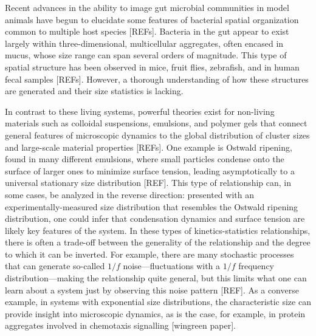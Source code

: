 \documentclass[aps,pre,twocolumn]{revtex4-1}
\begin{document}
Recent advances in the ability to image gut microbial communities in model animals have begun to elucidate some features of bacterial spatial organization common to multiple host species [REFs]. Bacteria in the gut appear to exist largely within three-dimensional, multicellular aggregates, often encased in mucus, whose size range can span several orders of magnitude. This type of spatial structure has been observed in mice, fruit flies, zebrafish, and in human fecal samples [REFs]. However, a thorough understanding of how these structures are generated and their size statistics is lacking. 

In contrast to these living systems, powerful theories exist for non-living materials such as colloidal suspensions, emulsions, and polymer gels that connect general features of microscopic dynamics to the global distribution of cluster sizes and large-scale material properties [REFs]. One example is Ostwald ripening, found in many different emulsions, where small particles condense onto the surface of larger ones to minimize surface tension, leading asymptotically to a universal stationary size distribution [REF]. This type of relationship can, in some cases, be analyzed in the reverse direction: presented with an experimentally-measured size distribution that resembles the Ostwald ripening distribution, one could infer that condensation dynamics and surface tension are likely key features of the system.  In these types of kinetics-statistics relationships, there is often a trade-off between the generality of the relationship and the degree to which it can be inverted. For example, there are many stochastic processes that can generate so-called $1/f$ noise---fluctuations with a $1/f$ frequency distribution---making the relationship quite general, but this limits what one can learn about a system just by observing this noise pattern [REF]. As a converse example, in systems with exponential size distributions, the characteristic size can provide insight into microscopic dynamics, as is the case, for example, in protein aggregates involved in chemotaxis signalling [wingreen paper].  
\end{document}
